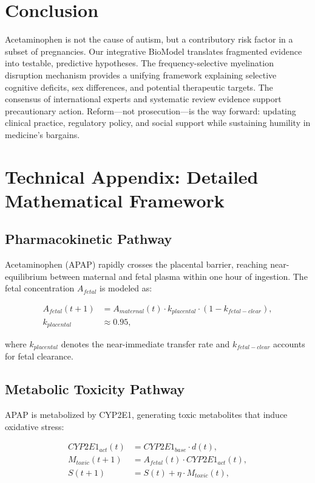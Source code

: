 \documentclass[12pt]{article}
\begin{document}
\section{Conclusion}
Acetaminophen is not the cause of autism, but a contributory risk factor in a subset of pregnancies. Our integrative BioModel translates fragmented evidence into testable, predictive hypotheses. The frequency-selective myelination disruption mechanism provides a unifying framework explaining selective cognitive deficits, sex differences, and potential therapeutic targets. The consensus of international experts \citep{bauer2021} and systematic review evidence \citep{navarro2025,masarwa2018} support precautionary action. Reform---not prosecution---is the way forward: updating clinical practice, regulatory policy, and social support while sustaining humility in medicine's bargains.

\appendix

\section{Technical Appendix: Detailed Mathematical Framework}

\subsection{Pharmacokinetic Pathway}
Acetaminophen (APAP) rapidly crosses the placental barrier, reaching near-equilibrium between maternal and fetal plasma within one hour of ingestion. The fetal concentration $A_{fetal}$ is modeled as:

\begin{align}
A_{fetal}(t+1) &= A_{maternal}(t) \cdot k_{placental} \cdot (1 - k_{fetal-clear}), \\
k_{placental} &\approx 0.95,
\end{align}

where $k_{placental}$ denotes the near-immediate transfer rate and $k_{fetal-clear}$ accounts for fetal clearance.

\subsection{Metabolic Toxicity Pathway}
APAP is metabolized by CYP2E1, generating toxic metabolites that induce oxidative stress:

\begin{align}
CYP2E1_{act}(t) &= CYP2E1_{base} \cdot d(t), \\
M_{toxic}(t+1) &= A_{fetal}(t) \cdot CYP2E1_{act}(t), \\
S(t+1) &= S(t) + \eta \cdot M_{toxic}(t),
\end{align}
\end{document}
